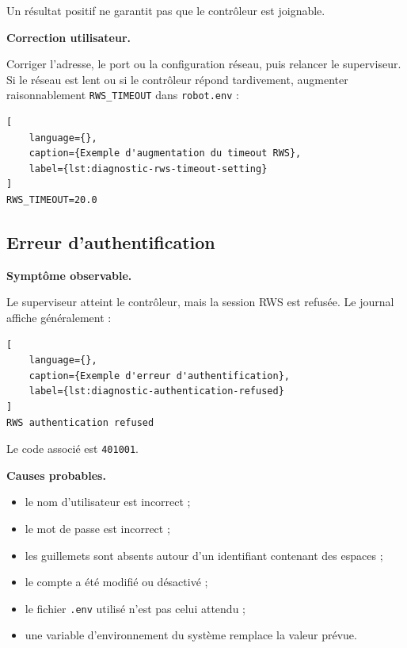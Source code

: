 \documentclass{rapportENSAM}
\begin{document}
Un résultat positif ne garantit pas que le contrôleur est joignable.

\textbf{Correction utilisateur.}

Corriger l'adresse, le port ou la configuration réseau, puis relancer le
superviseur. Si le réseau est lent ou si le contrôleur répond tardivement,
augmenter raisonnablement \texttt{RWS\_TIMEOUT} dans
\texttt{robot.env} :

\begin{lstlisting}[
    language={},
    caption={Exemple d'augmentation du timeout RWS},
    label={lst:diagnostic-rws-timeout-setting}
]
RWS_TIMEOUT=20.0
\end{lstlisting}


\subsection{Erreur d'authentification}
\label{subsec:diagnostic-authentication}

\textbf{Symptôme observable.}

Le superviseur atteint le contrôleur, mais la session RWS est refusée. Le
journal affiche généralement :

\begin{lstlisting}[
    language={},
    caption={Exemple d'erreur d'authentification},
    label={lst:diagnostic-authentication-refused}
]
RWS authentication refused
\end{lstlisting}

Le code associé est \texttt{401001}.

\textbf{Causes probables.}

\begin{itemize}
    \item le nom d'utilisateur est incorrect ;
    \item le mot de passe est incorrect ;
    \item les guillemets sont absents autour d'un identifiant contenant des
    espaces ;
    \item le compte a été modifié ou désactivé ;
    \item le fichier \texttt{.env} utilisé n'est pas celui attendu ;
    \item une variable d'environnement du système remplace la valeur prévue.
\end{itemize}
\end{document}
